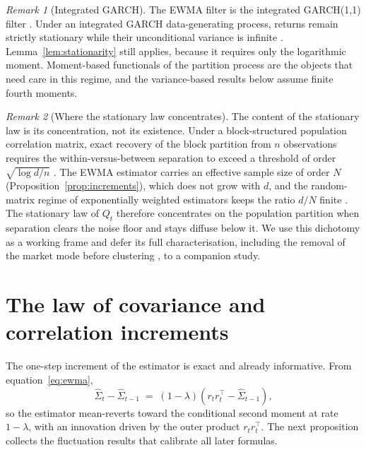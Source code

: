 \documentclass[11pt]{article}
\theoremstyle{remark}
\newtheorem{remark}{Remark}
\begin{document}
\begin{remark}[Integrated GARCH]
\label{rem:igarch}
The EWMA filter is the integrated GARCH(1,1) filter \citep{riskmetrics1996}.
Under an integrated GARCH data-generating process, returns remain strictly
stationary while their unconditional variance is infinite
\citep{nelson1990stationarity}. Lemma~\ref{lem:stationarity} still applies,
because it requires only the logarithmic moment. Moment-based functionals of
the partition process are the objects that need care in this regime, and the
variance-based results below assume finite fourth moments.
\end{remark}

\begin{remark}[Where the stationary law concentrates]
\label{rem:concentration}
The content of the stationary law is its concentration, not its existence.
Under a block-structured population correlation matrix, exact recovery of the
block partition from $n$ observations requires the within-versus-between
separation to exceed a threshold of order $\sqrt{\log d / n}$
\citep{bunea2020model}. The EWMA estimator carries an effective sample size of
order $N$ (Proposition~\ref{prop:increments}), which does not grow with $d$,
and the random-matrix regime of exponentially weighted estimators keeps the
ratio $d/N$ finite \citep{pafka2004exponential}. The stationary law of $Q_t$
therefore concentrates on the population partition when separation clears the
noise floor and stays diffuse below it. We use this dichotomy as a working
frame and defer its full characterisation, including the removal of the market
mode before clustering \citep{laloux1999noise, lopezdeprado2020machine}, to a
companion study.
\end{remark}

\section{The law of covariance and correlation increments}

The one-step increment of the estimator is exact and already informative. From
equation~\eqref{eq:ewma},
\begin{equation}
\widehat{\Sigma}_t - \widehat{\Sigma}_{t-1}
\;=\; (1-\lambda)\left( r_t r_t^{\top} - \widehat{\Sigma}_{t-1} \right),
\label{eq:increment}
\end{equation}
so the estimator mean-reverts toward the conditional second moment at rate
$1-\lambda$, with an innovation driven by the outer product $r_t r_t^{\top}$.
The next proposition collects the fluctuation results that calibrate all later
formulas.
\end{document}
